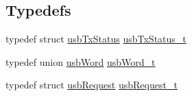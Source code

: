 \subsection*{Typedefs}
\begin{DoxyCompactItemize}
\item 
typedef struct \hyperlink{structusb_tx_status}{usb\-Tx\-Status} \hyperlink{mhvlib-_vusb-_console_2vusb_2usbdrv_8h_ae6a25e02d49899e1862aa987a6c09ade}{usb\-Tx\-Status\-\_\-t}
\item 
typedef union \hyperlink{unionusb_word}{usb\-Word} \hyperlink{mhvlib-_vusb-_console_2vusb_2usbdrv_8h_a992d37ca7c2980c180e963d4f78a30ea}{usb\-Word\-\_\-t}
\item 
typedef struct \hyperlink{structusb_request}{usb\-Request} \hyperlink{mhvlib-_vusb-_console_2vusb_2usbdrv_8h_afc46c8aeec21279368fa6147d3880564}{usb\-Request\-\_\-t}
\end{DoxyCompactItemize}
